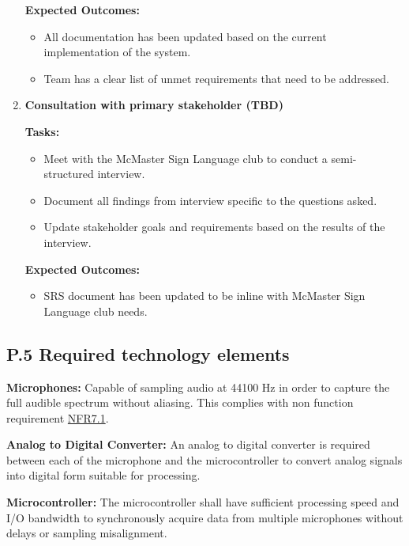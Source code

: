 \documentclass[12pt]{article}
\theoremstyle{definition}
\begin{document}
\begin{enumerate}
  \textbf{Expected Outcomes:}
  \begin{itemize}
      \item All documentation has been updated based on the current
      implementation of the system. 
      \item Team has a clear list of unmet requirements that need to be
      addressed. 
  \end{itemize}

  \vspace{0.8em}
  
  \item \textbf{Consultation with primary stakeholder (TBD)}    

  \textbf{Tasks:}
  \begin{itemize}
      \item Meet with the McMaster Sign Language club to conduct a
      semi-structured interview.
      \item Document all findings from interview specific to the questions
      asked. 
      \item Update stakeholder goals and requirements based on the results of
      the interview. 
  \end{itemize}

  \textbf{Expected Outcomes:}
  \begin{itemize}
      \item SRS document has been updated to be inline with McMaster Sign
      Language club needs. 
  \end{itemize}

  \vspace{0.8em}

\end{enumerate}


\subsection{P.5 Required technology elements}

\textbf{Microphones:}
Capable of sampling audio at 44100 Hz in order to capture the full audible
spectrum without aliasing. This complies with non function requirement
\hyperref[NFR7_1]{NFR7.1}.
  
\textbf{Analog to Digital Converter:}
An analog to digital converter is required between each of the microphone and
the microcontroller to convert analog signals into digital form suitable for
processing.
  
\textbf{Microcontroller:} 
The microcontroller shall have sufficient processing speed and I/O bandwidth to
synchronously acquire data from multiple microphones without delays or sampling
misalignment.
\end{document}
